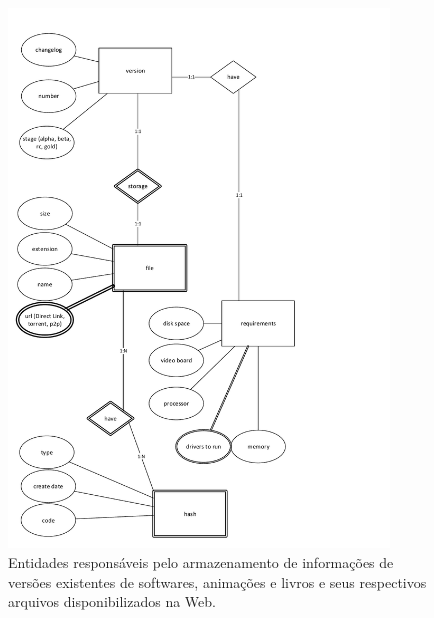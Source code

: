 \documentclass[12pt]{article}
\begin{document}
\begin{figure}[H]
\centering
\includegraphics[height=0.95\textheight,width=0.9\textwidth]{MER_-_Version.pdf}
\caption{Entidades responsáveis pelo armazenamento de informações de versões existentes de softwares, animações e livros e seus respectivos arquivos disponibilizados na Web.} \label{hash}
\end{figure}
\end{document}
